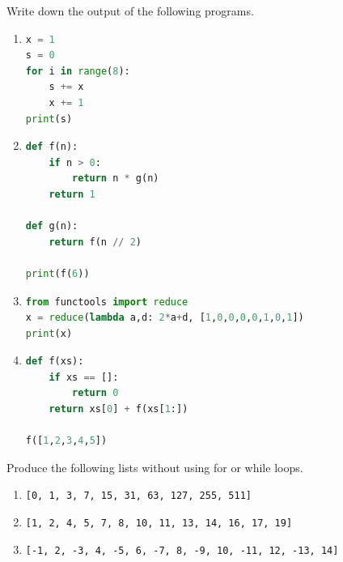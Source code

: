 \documentclass[addpoints,12pt]{exam}
\newcommand{\code}[1]{{\texttt{#1}}}
\begin{document}
\begin{questions}

\question[20]
Write down the output of the following programs.

\begin{enumerate}
\item 
\begin{lstlisting}[language=python]
x = 1
s = 0
for i in range(8):
    s += x
    x += 1
print(s)
\end{lstlisting}
\vfill


\item 
\begin{lstlisting}[language=python]
def f(n):
    if n > 0:
        return n * g(n)
    return 1

def g(n):
    return f(n // 2)

print(f(6))
\end{lstlisting}
\vfill


\item 
\begin{lstlisting}[language=python]
from functools import reduce
x = reduce(lambda a,d: 2*a+d, [1,0,0,0,0,1,0,1])
print(x)
\end{lstlisting}
\vfill

\item 
\begin{lstlisting}[language=python]
def f(xs):
    if xs == []:
        return 0
    return xs[0] + f(xs[1:])

f([1,2,3,4,5])
\end{lstlisting}
\vfill


\end{enumerate}

\newpage
\question[20] Produce the following lists without using for or while loops. 
\begin{enumerate}
  \item \code{[0, 1, 3, 7, 15, 31, 63, 127, 255, 511]}
    \vfill
  \item \code{[1, 2, 4, 5, 7, 8, 10, 11, 13, 14, 16, 17, 19]}
    \vfill
  \item \code{[-1, 2, -3, 4, -5, 6, -7, 8, -9, 10, -11, 12, -13, 14]}
    \vfill
\end{enumerate}



\end{questions}
\end{document}
